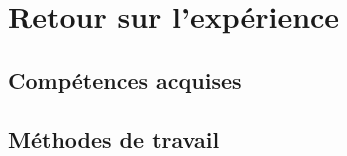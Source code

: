 \section{Retour sur l'expérience}

\subsection{Compétences acquises}

\subsection{Méthodes de travail}
